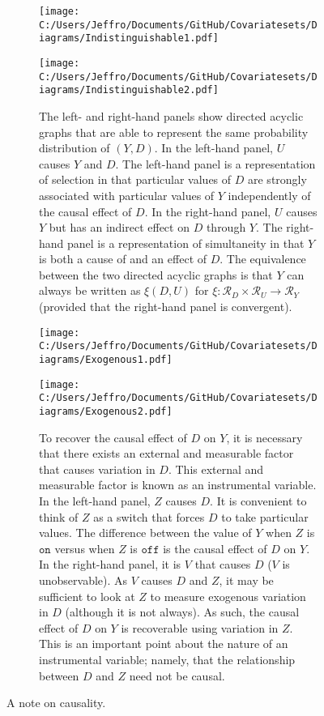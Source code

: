\documentclass[10pt,a4paper,twoside]{article}
\numberwithin{equation}{section}
\begin{document}
\begin{figure}[p]
\centering
\begin{subfigure}{0.4\textwidth}
  \centering
  \texttt{[image: C:/Users/Jeffro/Documents/GitHub/Covariatesets/Diagrams/Indistinguishable1.pdf]}
  \label{fig:indistinguishable1}
  \end{subfigure}
  \begin{subfigure}{0.4\textwidth}
  \centering
  \texttt{[image: C:/Users/Jeffro/Documents/GitHub/Covariatesets/Diagrams/Indistinguishable2.pdf]}
  \label{fig:indistinguishable2}
  \end{subfigure}
\begin{subfigure}{0.8\textwidth}
  \caption{The left- and right-hand panels show directed acyclic graphs that are able to represent the same probability distribution of $(Y,D)$. In the left-hand panel, $U$ causes $Y$ and $D$. The left-hand panel is a representation of selection in that particular values of $D$ are strongly associated with particular values of $Y$ independently of the causal effect of $D$. In the right-hand panel, $U$ causes $Y$ but has an indirect effect on $D$ through $Y$. The right-hand panel is a representation of simultaneity in that $Y$ is both a cause of and an effect of $D$. The equivalence between the two directed acyclic graphs is that $Y$ can always be written as $\xi(D,U)$ for $\xi : \mathcal{R}_D\times\mathcal{R}_U\rightarrow\mathcal{R}_Y$ (provided that the right-hand panel is convergent).}
  \end{subfigure}
   \begin{subfigure}{0.4\textwidth}
  \centering
  \texttt{[image: C:/Users/Jeffro/Documents/GitHub/Covariatesets/Diagrams/Exogenous1.pdf]}
  \label{fig:exogenous1}
  \end{subfigure}
   \begin{subfigure}{0.4\textwidth}
  \centering
  \texttt{[image: C:/Users/Jeffro/Documents/GitHub/Covariatesets/Diagrams/Exogenous2.pdf]}
  \label{fig:exogenous2}
  \end{subfigure}
  \begin{subfigure}{0.8\textwidth}
  \caption{To recover the causal effect of $D$ on $Y$, it is necessary that there exists an external and measurable factor that causes variation in $D$. This external and measurable factor is known as an instrumental variable. In the left-hand panel, $Z$ causes $D$. It is convenient to think of $Z$ as a switch that forces $D$ to take particular values. The difference between the value of $Y$ when $Z$ is $\mathtt{on}$ versus when $Z$ is $\mathtt{off}$ is the causal effect of $D$ on $Y$. In the right-hand panel, it is $V$ that causes $D$ ($V$ is unobservable). As $V$ causes $D$ and $Z$, it may be sufficient to look at $Z$ to measure exogenous variation in $D$ (although it is not always). As such, the causal effect of $D$ on $Y$ is recoverable using variation in $Z$. This is an important point about the nature of an instrumental variable; namely, that the relationship between $D$ and $Z$ need not be causal.}
  \end{subfigure}
  \caption{A note on causality.}
  \label{fig:causality}
\end{figure}
\end{document}
